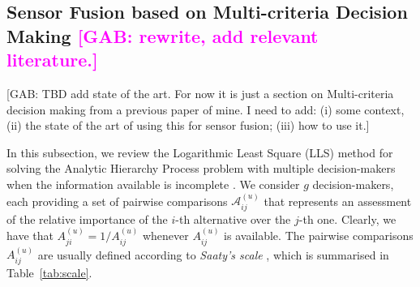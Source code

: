 \documentclass[journal]{IEEEtran}
\newcommand{\GO}[1]{\textcolor{magenta}{{#1}}}
\newcommand{\TC}[1]{\textcolor{cyan}{{#1}}}
\begin{document}
\TC{\cite{jao_uwbzupt_2023}}

\subsection{Sensor Fusion based on Multi-criteria Decision Making \GO{[GAB: rewrite, add relevant literature.]}} 

\color{magenta}
[GAB: TBD add state of the art. For now it is just a section on Multi-criteria decision making from a previous paper of mine. I need to add: (i) some context, (ii) the state of the art of using this for sensor fusion; (iii) how to use it.]

In this subsection, we review the Logarithmic Least Square (LLS) method for solving the Analytic Hierarchy Process problem with multiple decision-makers when the information available is incomplete \cite{bozoki_optimality_2019,oliva_opinion_2019}. We consider $g$ decision-makers, each providing a set of pairwise comparisons $\mathcal{A}^{(u)}_{ij}$ that represents an assessment of the relative importance of the $i$-th alternative over the $j$-th one. Clearly, we have that $A_{ji}^{(u)}=1/A_{ij}^{(u)}$ whenever $A_{ij}^{(u)}$ is available.
The pairwise comparisons $A_{ij}^{(u)}$ are usually defined according to {\em Saaty's scale} \cite{saaty_analytic_1987}, which is summarised in Table~\ref{tab:scale}.
\begin{table}
\small
\centering
{}
 \caption{Saaty's scale for AHP.}
 \label{tab:scale}
 \end{table}
\end{document}
